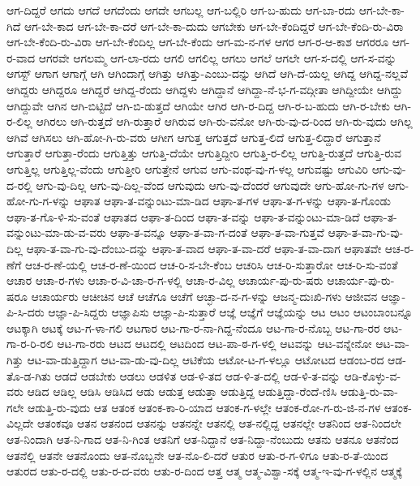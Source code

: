 {ಆಗ-ದಿದ್ದರೆ
ಆಗದು
ಆಗದೆ
ಆಗದೆಂದು
ಆಗದೇ
ಆಗಬಲ್ಲ
ಆಗ-ಬಲ್ಲಿರಿ
ಆಗ-ಬ-ಹುದು
ಆಗ-ಬಾ-ರದು
ಆಗ-ಬೇ-ಕಾ-ಗಿದೆ
ಆಗ-ಬೇ-ಕಾದ
ಆಗ-ಬೇ-ಕಾ-ದರೆ
ಆಗ-ಬೇ-ಕಾ-ದುದು
ಆಗಬೇಕು
ಆಗ-ಬೇ-ಕೆಂದಿದ್ದರೆ
ಆಗ-ಬೇ-ಕೆಂದಿ-ರು-ವಿರಾ
ಆಗ-ಬೇ-ಕೆಂದಿ-ರು-ವಿರಾ
ಆಗ-ಬೇ-ಕೆಂದಿಲ್ಲ
ಆಗ-ಬೇ-ಕೆಂದು
ಆಗ-ಮ-ನ-ಗಳ
ಆಗರ
ಆಗ-ರ-ಆ-ಕಾಶ
ಆಗರರೂ
ಆಗ-ರ-ವಾದ
ಆಗರವೇ
ಆಗಲಮ್ಮ
ಆಗ-ಲಾ-ರದು
ಆಗಲಿ
ಆಗಲಿಲ್ಲ
ಆಗಲು
ಆಗಲೆ
ಆಗಲೇ
ಆಗ-ಸ-ದಲ್ಲಿ
ಆಗ-ಸ-ವನ್ನು
ಆಗಸ್ಟ್
ಆಗಾಗ
ಆಗಾಗ್ಗೆ
ಆಗಿ
ಆಗಿಂದಾಗ್ಗೆ
ಆಗಿತ್ತು
ಆಗಿತ್ತು-ಎಂಬು-ದನ್ನು
ಆಗಿದೆ
ಆಗಿ-ದೆ-ಯಲ್ಲ
ಆಗಿದ್ದ
ಆಗಿದ್ದ-ನಲ್ಲವೆ
ಆಗಿದ್ದರು
ಆಗಿದ್ದರೂ
ಆಗಿದ್ದರೆ
ಆಗಿದ್ದ-ರೆಂದು
ಆಗಿದ್ದಳು
ಆಗಿದ್ದಾನೆ
ಆಗಿದ್ದಾ-ನೆ-ಭ-ಗ-ವದ್ಗೀತಾ
ಆಗಿದ್ದೀಯೇ
ಆಗಿದ್ದು
ಆಗಿದ್ದುವೇ
ಆಗಿನ
ಆಗಿ-ಬಿಟ್ಟಿದೆ
ಆಗಿ-ಬಿ-ಡುತ್ತದೆ
ಆಗಿಯೇ
ಆಗಿರ
ಆಗಿ-ರ-ದಿದ್ದ
ಆಗಿ-ರ-ಬ-ಹುದು
ಆಗಿ-ರ-ಬೇಕು
ಆಗಿ-ರ-ಲಿಲ್ಲ
ಆಗಿರಲು
ಆಗಿ-ರುತ್ತದೆ
ಆಗಿ-ರುತ್ತಾರೆ
ಆಗಿರುವ
ಆಗಿ-ರು-ವನೋ
ಆಗಿ-ರು-ವು-ದ-ರಿಂದ
ಆಗಿ-ರು-ವುದು
ಆಗಿಲ್ಲ
ಆಗಿವೆ
ಆಗಿಸಲು
ಆಗಿ-ಹೋ-ಗಿ-ರು-ವರು
ಆಗೀಗ
ಆಗುತ್ತ
ಆಗುತ್ತದೆ
ಆಗುತ್ತ-ಲಿದೆ
ಆಗುತ್ತ-ಲಿದ್ದಾರೆ
ಆಗುತ್ತಾನೆ
ಆಗುತ್ತಾರೆ
ಆಗುತ್ತಾ-ರೆಂದು
ಆಗುತ್ತಿತ್ತು
ಆಗುತ್ತಿ-ದೆಯೇ
ಆಗುತ್ತಿದ್ದೀರಿ
ಆಗುತ್ತಿ-ರ-ಲಿಲ್ಲ
ಆಗುತ್ತಿ-ರುತ್ತದೆ
ಆಗುತ್ತಿ-ರುವ
ಆಗುತ್ತಿಲ್ಲ
ಆಗುತ್ತಿಲ್ಲ-ವೆಂದು
ಆಗುತ್ತೀರಿ
ಆಗುತ್ತೇನೆ
ಆಗುವ
ಆಗು-ವಂಥ-ವು-ಗ-ಳಲ್ಲ
ಆಗುವಷ್ಟು
ಆಗುವಿರಿ
ಆಗು-ವು-ದ-ರಲ್ಲಿ
ಆಗು-ವು-ದಿಲ್ಲ
ಆಗು-ವು-ದಿಲ್ಲ-ವೆಂದ
ಆಗುವುದು
ಆಗು-ವು-ದೆಂದರೆ
ಆಗುವುದೇ
ಆಗು-ಹೋ-ಗು-ಗಳ
ಆಗು-ಹೋ-ಗು-ಗ-ಳನ್ನು
ಆಘಾತ
ಆಘಾ-ತ-ವನ್ನುಂಟು-ಮಾ-ಡಿದ
ಆಘಾ-ತ-ಗಳ
ಆಘಾ-ತ-ಗ-ಳನ್ನು
ಆಘಾ-ತ-ಗೊಂಡು
ಆಘಾ-ತ-ಗೊ-ಳಿ-ಸು-ವಂತೆ
ಆಘಾತದ
ಆಘಾ-ತ-ದಿಂದ
ಆಘಾ-ತ-ವನ್ನು
ಆಘಾ-ತ-ವನ್ನುಂಟು-ಮಾ-ಡಿದೆ
ಆಘಾ-ತ-ವನ್ನುಂಟು-ಮಾ-ಡು-ವ-ವರು
ಆಘಾ-ತ-ವನ್ನೂ
ಆಘಾ-ತ-ವಾ-ಗ-ದಂತೆ
ಆಘಾ-ತ-ವಾ-ಗುತ್ತವೆ
ಆಘಾ-ತ-ವಾ-ಗು-ವು-ದಿಲ್ಲ
ಆಘಾ-ತ-ವಾ-ಗು-ವು-ದೆಂಬು-ದನ್ನು
ಆಘಾ-ತ-ವಾದ
ಆಘಾ-ತ-ವಾ-ದರೆ
ಆಘಾ-ತ-ವಾ-ದಾಗ
ಆಘಾತವೇ
ಆಚ-ರ-ಣೆಗೆ
ಆಚ-ರ-ಣೆ-ಯಲ್ಲಿ
ಆಚ-ರ-ಣೆ-ಯಿಂದ
ಆಚ-ರಿ-ಸ-ಬೇ-ಕೆಂಬ
ಆಚರಿಸಿ
ಆಚ-ರಿ-ಸುತ್ತಾರೋ
ಆಚ-ರಿ-ಸು-ವಂತೆ
ಆಚಾರ
ಆಚಾ-ರ-ಗಳು
ಆಚಾ-ರ-ವಿ-ಚಾ-ರ-ಗ-ಳಲ್ಲಿ
ಆಚಾ-ರ-ವಿಲ್ಲ
ಆಚಾರ್ಯ-ಪು-ರು-ಷರು
ಆಚಾರ್ಯ-ಪು-ರು-ಷರೂ
ಆಚಾರ್ಯರು
ಆಚೀಚಿನ
ಆಚೆ
ಆಚೆಗೂ
ಆಚೆಗೆ
ಆಚ್ಛಾ-ದ-ನ-ಗ-ಳನ್ನು
ಆಜನ್ಮ-ದುಃಖಿ-ಗಳು
ಆಜೀವನ
ಆಜ್ಞಾ-ಪಿ-ಸಿ-ದರು
ಆಜ್ಞಾ-ಪಿ-ಸಿದ್ದರು
ಆಜ್ಞಾಪಿಸು
ಆಜ್ಞಾ-ಪಿ-ಸುತ್ತಾರೆ
ಆಜ್ಞೆ
ಆಜ್ಞೆಗೆ
ಆಜ್ಞೆಯನ್ನು
ಆಟ
ಆಟಂ
ಆಟಂಬಾಂಬನ್ನೂ
ಆಟಕ್ಕಾಗಿ
ಆಟಕ್ಕೆ
ಆಟ-ಗ-ಳಾ-ಗಲಿ
ಆಟಗಾರ
ಆಟ-ಗಾ-ರ-ನಾ-ಗಿದ್ದ-ನೆಂದೂ
ಆಟ-ಗಾ-ರ-ನೊಬ್ಬ
ಆಟ-ಗಾ-ರರ
ಆಟ-ಗಾ-ರ-ರಿ-ರಲಿ
ಆಟ-ಗಾ-ರರು
ಆಟದ
ಆಟದಲ್ಲಿ
ಆಟದಿಂದ
ಆಟ-ಪಾ-ಠ-ಗ-ಳಲ್ಲಿ
ಆಟವನ್ನು
ಆಟ-ವನ್ನೇನೋ
ಆಟ-ವಾ-ಗಿತ್ತು
ಆಟ-ವಾ-ಡುತ್ತಿದ್ದಾಗ
ಆಟ-ವಾ-ಡು-ವು-ದಿಲ್ಲ
ಆಟಿಕೆಯ
ಆಟೋ-ಟ-ಗ-ಳಲ್ಲೂ
ಆಟೋಟದ
ಆಡಂಬ-ರದ
ಆಡ-ತೊ-ಡ-ಗಿತು
ಆಡದೆ
ಆಡಬೇಕು
ಆಡಲು
ಆಡಳಿತ
ಆಡ-ಳಿ-ತದ
ಆಡ-ಳಿ-ತ-ದಲ್ಲಿ
ಆಡ-ಳಿ-ತ-ವನ್ನು
ಆಡಿ-ಕೊಳ್ಳು-ವ-ವರು
ಆಡಿದ
ಆಡಿಲ್ಲ
ಆಡಿಸಿ
ಆಡಿಸಿದ
ಆಡು
ಆಡುತ್ತ
ಆಡುತ್ತಾ
ಆಡುತ್ತಿದ್ದ
ಆಡುತ್ತಿದ್ದಾ-ರೆಂದೆ-ಣಿಸಿ
ಆಡುತ್ತಿ-ರು-ವಾ-ಗಲೇ
ಆಡುತ್ತಿ-ರು-ವುದು
ಆತ
ಆತಂಕ
ಆತಂಕ-ಕಾ-ರಿ-ಯಾದ
ಆತಂಕ-ಗ-ಳಲ್ಲೇ
ಆತಂಕ-ರೋ-ಗ-ರು-ಜಿ-ನ-ಗಳ
ಆತಂಕ-ವಿಲ್ಲದೇ
ಆತಂಕವೂ
ಆತನ
ಆತನಂದ
ಆತನನ್ನು
ಆತನನ್ನೇ
ಆತನಲ್ಲಿ
ಆತ-ನಲ್ಲಿದ್ದ
ಆತನಲ್ಲೇ
ಆತನಿಂದ
ಆತ-ನಿಂದಲೇ
ಆತ-ನಿಂದಾಗಿ
ಆತ-ನಿ-ಗಾದ
ಆತ-ನಿ-ಗಿಂತ
ಆತನಿಗೆ
ಆತ-ನಿದ್ದಾನೆ
ಆತ-ನಿದ್ದಾ-ನೆಂಬುದು
ಆತನು
ಆತನೂ
ಆತನೆಂದ
ಆತನೆಲ್ಲಿ
ಆತನೇ
ಆತನೊಂದು
ಆತ-ನೊಬ್ಬನೇ
ಆತ-ನೊ-ಲಿ-ದರೆ
ಆತುರ
ಆತು-ರ-ಗ-ಳಿಗೂ
ಆತು-ರ-ತೆ-ಯಿಂದ
ಆತುರದ
ಆತು-ರ-ದಲ್ಲಿ
ಆತು-ರ-ದ-ವರು
ಆತು-ರ-ದಿಂದ
ಆತ್ತ
ಆತ್ಮ
ಆತ್ಮ-ವಿಶ್ವಾ-ಸಕ್ಕೆ
ಆತ್ಮ-ಇ-ವು-ಗ-ಳಲ್ಲಿನ
ಆತ್ಮಕ್ಕೆ
}
